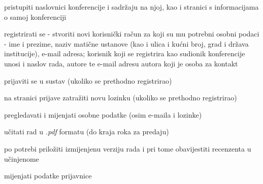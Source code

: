 			
			\begin{packed_enum}
					\item  {}
				
				\begin{packed_enum}
					
					\item pristupiti naslovnici konferencije i sadržaju na njoj, kao i stranici s informacijama o samoj konferenciji
					\item registrirati se - stvoriti novi korisnički račun za koji su mu potrebni osobni podaci - ime i prezime, naziv matične ustanove (kao i ulica i kućni broj, grad i država institucije), e-mail adresa; korisnik koji se registrira kao sudionik konferencije unosi i naslov rada, autore te e-mail adresu autora koji je osoba za kontakt 
					\item prijaviti se u sustav (ukoliko se prethodno registrirao)
					\item na stranici prijave zatražiti novu lozinku (ukoliko se prethodno registrirao)
					
				\end{packed_enum}
			 	\item  {}
			 
			 	\begin{packed_enum}
					\item  {}
				
					\begin{packed_enum}
					
						\item pregledavati i mijenjati osobne podatke (osim e-maila i lozinke)
						\item učitati rad u \textit{.pdf} formatu (do kraja roka za predaju)
						\item po potrebi priložiti izmijenjenu verziju rada i pri tome obavijestiti recenzenta u učinjenome
						\item mijenjati podatke prijavnice
					
					
					\end{packed_enum}
				
					\item  {}
				
					\begin{packed_enum}
					

\end{packed_enum}
\end{packed_enum}
\end{packed_enum}
